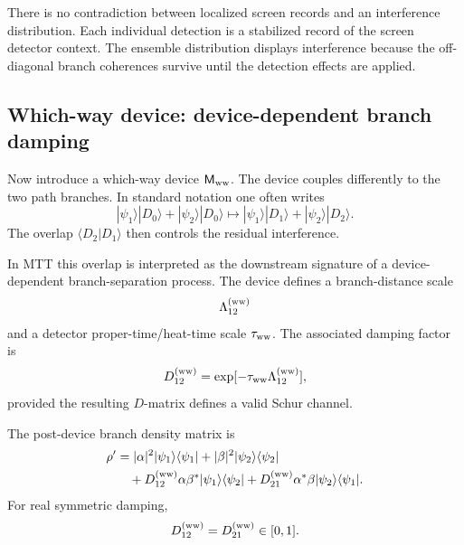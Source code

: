 \documentclass[11pt]{article}
\newcommand{\Meas}{\mathsf M}
\begin{document}
\begin{remark}
\label{rem:localized-events-interference-distribution}
There is no contradiction between localized screen records and an interference distribution.
Each individual detection is a stabilized record of the screen detector context. The ensemble
distribution displays interference because the off-diagonal branch coherences survive until
the detection effects are applied.
\end{remark}

\subsection{Which-way device: device-dependent branch damping}
\label{subsec:which-way-device}

Now introduce a which-way device \(\Meas_{\rm ww}\). The device couples differently to the
two path branches. In standard notation one often writes
\begin{equation}
  |\psi_1\rangle|D_0\rangle
  +
  |\psi_2\rangle|D_0\rangle
  \longmapsto
  |\psi_1\rangle|D_1\rangle
  +
  |\psi_2\rangle|D_2\rangle.
  \label{eq:which-way-standard}
\end{equation}
The overlap \(\langle D_2|D_1\rangle\) then controls the residual interference.

In MTT this overlap is interpreted as the downstream signature of a device-dependent
branch-separation process. The device defines a branch-distance scale
\begin{equation}
  \Lambda_{12}^{(\rm ww)}
\end{equation}
and a detector proper-time/heat-time scale \(\tau_{\rm ww}\). The associated damping factor is
\begin{equation}
  D_{12}^{(\rm ww)}
  =
  \exp[-\tau_{\rm ww}\Lambda_{12}^{(\rm ww)}],
  \label{eq:which-way-damping}
\end{equation}
provided the resulting \(D\)-matrix defines a valid Schur channel.

The post-device branch density matrix is
\begin{align}
  \rho'
  &=
  |\alpha|^2|\psi_1\rangle\langle\psi_1|
  +
  |\beta|^2|\psi_2\rangle\langle\psi_2|
  \nonumber\\
  &\quad+
  D_{12}^{(\rm ww)}
  \alpha\beta^\ast|\psi_1\rangle\langle\psi_2|
  +
  D_{21}^{(\rm ww)}
  \alpha^\ast\beta|\psi_2\rangle\langle\psi_1|.
  \label{eq:post-which-way-density}
\end{align}
For real symmetric damping,
\begin{equation}
  D_{12}^{(\rm ww)}=D_{21}^{(\rm ww)}\in[0,1].
\end{equation}
\end{document}
